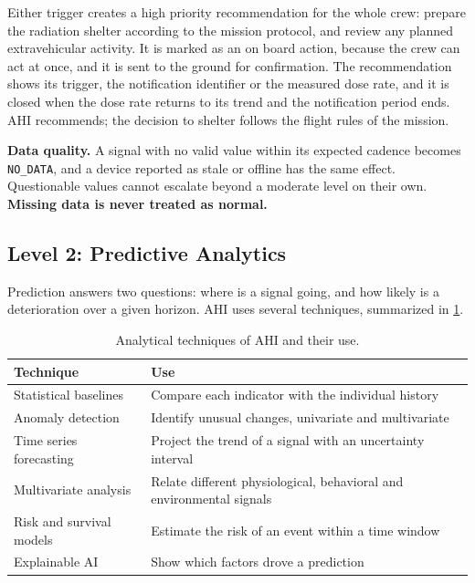 Either trigger creates a high priority recommendation for the whole crew: prepare the radiation shelter according to the mission protocol, and review any planned extravehicular activity. It is marked as an on board action, because the crew can act at once, and it is sent to the ground for confirmation. The recommendation shows its trigger, the notification identifier or the measured dose rate, and it is closed when the dose rate returns to its trend and the notification period ends. AHI recommends; the decision to shelter follows the flight rules of the mission.

\medskip\noindent\textbf{Data quality.} A signal with no valid value within its expected cadence becomes \texttt{NO\_DATA}, and a device reported as stale or offline has the same effect. Questionable values cannot escalate beyond a moderate level on their own. \textbf{Missing data is never treated as normal.}

\subsection{Level 2: Predictive Analytics}
\label{subsec:trend-analysis}

Prediction answers two questions: where is a signal going, and how likely is a deterioration over a given horizon. AHI uses several techniques, summarized in \ref{tab:techniques}.

\begin{table}[htbp]
\centering
\vspace{0.8em}
\caption{Analytical techniques of AHI and their use.}
\label{tab:techniques}
\small
\begin{tabular}{p{4.2cm}p{9.8cm}}
\hline
\textbf{Technique} & \textbf{Use} \\
\hline
Statistical baselines & Compare each indicator with the individual history \\
Anomaly detection & Identify unusual changes, univariate and multivariate \\
Time series forecasting & Project the trend of a signal with an uncertainty interval \\
Multivariate analysis & Relate different physiological, behavioral and environmental signals \\
Risk and survival models & Estimate the risk of an event within a time window \\
Explainable AI & Show which factors drove a prediction \\
\hline
\end{tabular}
\vspace{1.2em}
\end{table}

